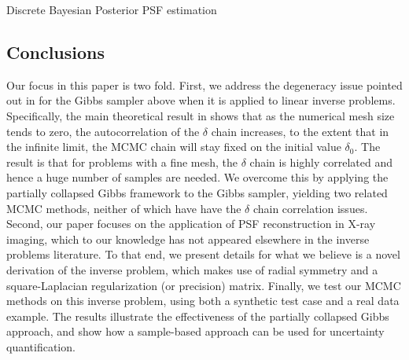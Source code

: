 \begin{chapter}{Discrete Bayesian Posterior PSF estimation}
\subsection{Conclusions} \label{sec:Conclusions}

\begin{com}
Our focus in this paper is two fold. 
First, we address the degeneracy issue pointed out in \cite{AgaBarPapStu} for the Gibbs sampler above when it is applied to linear inverse problems. 
Specifically, the main theoretical result in \cite{AgaBarPapStu} shows that as the numerical mesh size tends to zero, the autocorrelation of the $\delta$ chain increases, to the extent that in the infinite limit, the MCMC chain will stay fixed on the initial value $\delta_0$. 
The result is that for problems with a fine mesh, the $\delta$ chain is highly correlated and hence a huge number of samples are needed. 
We overcome this by applying the partially collapsed Gibbs framework to the Gibbs sampler, yielding two related MCMC methods, neither of which have have the $\delta$ chain correlation issues. 
Second, our paper focuses on the application of PSF reconstruction in X-ray imaging, which to our knowledge has not appeared elsewhere in the inverse problems literature. 
To that end, we present details for what we believe is a novel derivation of the inverse problem, which makes use of radial symmetry and a square-Laplacian regularization (or precision) matrix. 
Finally, we test our MCMC methods on this inverse problem, using both a synthetic test case and a real data example. 
The results illustrate the effectiveness of the partially collapsed Gibbs approach, and show how a sample-based approach can be used for uncertainty quantification.
\end{com}
\end{chapter}
